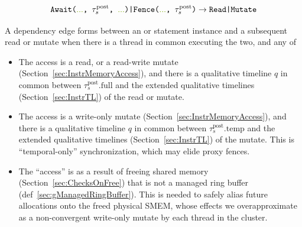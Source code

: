 
\begin{equation*}
    \texttt{Await(\codecomment{...}, $\tau_s^\mathrm{post}$, \codecomment{...})|Fence(\codecomment{...}, $\tau_s^\mathrm{post}$)} \to \texttt{Read|Mutate}
\end{equation*}

A dependency edge forms between an  or  statement instance and a subsequent read or mutate when there is a thread in common executing the two, and any of
\begin{itemize}
  \item The access is a read, or a read-write mutate (Section~\ref{sec:InstrMemoryAccess}), and there is a qualitative timeline $q$ in common between $\tau_s^\mathrm{post}.\mathrm{full}$ and the extended qualitative timelines (Section~\ref{sec:InstrTL}) of the read or mutate.
  \item The access is a write-only mutate (Section~\ref{sec:InstrMemoryAccess}), and there is a qualitative timeline $q$ in common between $\tau_s^\mathrm{post}.\mathrm{temp}$ and the extended qualitative timelines (Section~\ref{sec:InstrTL}) of the mutate.
  This is ``temporal-only'' synchronization, which may elide proxy fences.
  \item The ``access'' is as a result of freeing shared memory (Section~\ref{sec:ChecksOnFree}) that is not a managed ring buffer (def~\ref{sec:gManagedRingBuffer}).
  This is needed to safely alias future allocations onto the freed physical SMEM, whose effects we overapproximate as a non-convergent write-only mutate by each thread in the cluster.
\end{itemize}

